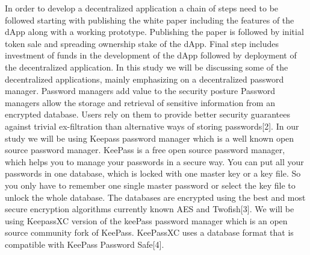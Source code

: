 \documentclass[12pt]{article}
\begin{document}
In order to develop a decentralized application a chain of steps  need to be followed starting with publishing the white paper including the features of the dApp along with a working prototype. Publishing the paper is followed by initial token sale and spreading ownership stake of the dApp. Final step includes investment of funds in the development of the dApp followed by deployment of the decentralized application. In this study we will be discussing some of the decentralized applications, mainly emphasizing on a decentralized password manager. Password managers add value to  the security posture Password managers allow the storage and retrieval of sensitive information from an encrypted database. Users rely on them to provide better security guarantees against trivial ex-filtration than alternative ways of storing passwords[2].
\bigskip
 In our study we will be using Keepass password manager which is a well known open source password manager. KeePass is a free open source password manager, which helps you to manage your passwords in a secure way. You can put all your passwords in one database, which is locked with one master key or a key file. So you only have to remember one single master password or select the key file to unlock the whole database. The databases are encrypted using the best and most secure encryption algorithms currently known AES and Twofish[3]. We will be using KeepassXC version of the keePass password manager which is an open source community fork of KeePass. KeePassXC uses a database format that is compatible with KeePass Password Safe[4].  
\end{document}
